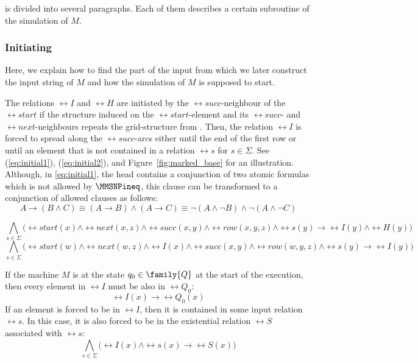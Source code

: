 \documentclass{lmcs}
\begin{document}
 is divided into several paragraphs. 
Each of them describes a certain subroutine of the simulation of $M$.

\subsubsection*{Initiating}




Here, we explain how to find the part of the input from which we later construct the input string of $M$ and how the simulation of $M$ is supposed to start.

The relations $\rel{I}$ and $\rel{H}$ are initiated by the $\rel{succ}$-neighbour of the $\rel{start}$ if the structure induced on the $\rel{start}$-element and its $\rel{succ}$- and $\rel{next}$-neighbours repeats the grid-structure from .
Then, the relation $\rel{I}$ is forced to spread  along the $\rel{succ}$-arcs either until the end of the first row or until an element that is not contained in a relation $\rel{s}$ for $s\in\Sigma$.
See (\ref{eq:initial1}), (\ref{eq:initial2}), and Figure~\ref{fig:marked_base} for an illustration.
Although, in \cref{eq:initial1}, the head contains a conjunction of two atomic formulas which is not allowed by $\MMSNPineq$, this clause can be transformed to a conjunction of allowed clauses as follows:
\begin{equation*}
A\rightarrow(B\wedge C)\equiv (A\rightarrow B)\wedge (A\rightarrow C)\equiv \neg (A\wedge \neg B)\wedge \neg(A\wedge\neg C)
\end{equation*}




\begin{equation}\label{eq:initial1}
\bigwedge_{s\in\Sigma}\bigl(\rel{start}(x)\wedge\rel{next}(x,z)\wedge\rel{succ}(x,y)\wedge\rel{row}(x,y,z)\wedge\rel{s}(y)\rightarrow\rel{I}(y)\wedge\rel{H}(y)\bigr)
\end{equation}
\begin{equation}\label{eq:initial2}
\bigwedge_{s\in\Sigma}\bigl(\rel{start}(w)\wedge\rel{next}(w,z)\wedge\rel{I}(x)\wedge\rel{succ}(x,y)\wedge\rel{row}(w,y,z)\wedge\rel{s}(y)\rightarrow\rel{I}(y)\bigr)
\end{equation}


If the machine $M$ is at the state $q_0\in\family{Q}$ at the start of the execution, then every element in $\rel{I}$ must be also in $\rel{Q}_0$:
\begin{equation}\label{eq:initiating_q}
\rel{I}(x)\to\rel{Q}_0(x)
\end{equation}
If an element is forced to be in $\rel{I}$, then it is contained in some input relation $\rel{s}$.
In this case, it is also forced to be in the existential relation $\rel{S}$ associated with $\rel{s}$:
\begin{equation}\label{eq:initiating_s}
\bigwedge_{s\in\Sigma}\bigl(\rel{I}(x)\wedge\rel{s}(x)\to\rel{S}(x)\bigr)
\end{equation}
\end{document}
